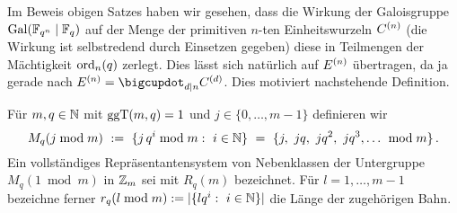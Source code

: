 Im Beweis obigen Satzes haben wir gesehen, dass die Wirkung der Galoisgruppe
$\operatorname{Gal}(\mathbb{F}_{q^n}\mid \mathbb{F}_q)$ auf der Menge der primitiven $n$-ten Einheitswurzeln
$C^{(n)}$ (die Wirkung ist selbstredend durch Einsetzen gegeben) diese in 
Teilmengen der Mächtigkeit $\operatorname{ord}_n(q)$ zerlegt.
Dies lässt sich natürlich auf $E^{(n)}$ übertragen, da ja gerade 
nach 
$E\kl n = \bigcupdot_{d\mid n} C\kl d$. 
Dies motiviert nachstehende Definition.


  


\begin{definition}
  \label{def:nebenklassen_mod_m}
  Für $m,q\in\mathbb{N}$ mit $\operatorname{ggT}(m,q) = 1$ und $j \in \{0,\ldots,m-1\}$ definieren wir
  \[ M_q(j\bmod m) \ :=\  \{ j\,q^i \bmod m:\ i\in\mathbb{N}\} \ =\  
    \{j,\ jq,\ jq^2,\ jq^3,\ldots\ \bmod m\}\,.\]
  Ein vollständiges Repräsentantensystem von Nebenklassen 
  der Untergruppe $M_q(1\bmod m)$
  in $\mathbb{Z}_m$ sei mit $R_q(m)$ bezeichnet. Für $l=1,\ldots,m-1$
  bezeichne ferner
  $r_q(l \bmod m) := |\{lq^i:\ i\in \N \}|$ die Länge der zugehörigen Bahn.
\end{definition}

